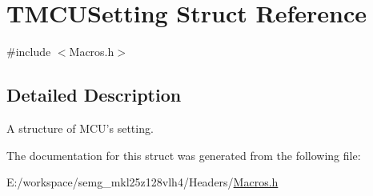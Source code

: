 \hypertarget{struct_t_m_c_u_setting}{\section{T\-M\-C\-U\-Setting Struct Reference}
\label{struct_t_m_c_u_setting}
}


{\ttfamily \#include $<$Macros.\-h$>$}



\subsection{Detailed Description}
A structure of M\-C\-U's setting. 

The documentation for this struct was generated from the following file\-:\begin{DoxyCompactItemize}
\item 
E\-:/workspace/semg\-\_\-mkl25z128vlh4/\-Headers/\hyperlink{_macros_8h}{Macros.\-h}\end{DoxyCompactItemize}
